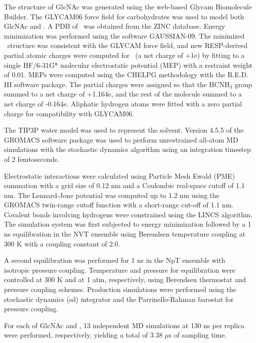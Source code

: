 The structure of GlcNAc was generated using the web-based Glycam Biomolecule Builder.\cite{Woods:glycambuilder} The GLYCAM06 force field for carbohydrates\cite{Kirschner:2008ii} was used to model both GlcNAc and \glucosamine. A PDB of \glucosamine\ was obtained from the ZINC database.\cite{Irwin:2005kx} Energy minimization was performed using the software GAUSSIAN-09.\cite{g09} The minimized \glucosamine\ structure was consistent with the GLYCAM force field, and new RESP-derived partial atomic charges were computed for \glucosamine\ (a net charge of +1e) by fitting to a single HF/6-31G* molecular electrostatic potential (MEP) with a restraint weight of 0.01. MEPs were computed using the CHELPG methodology\cite{Breneman:1990ue} with the R.E.D. III software package.\cite{Dupradeau:2010bb} The partial charges were assigned so that the HCNH$_{3}$ group summed to a net charge of +1.164e, and the rest of the molecule summed to a net charge of -0.164e. Aliphatic hydrogen atoms were fitted with a zero partial charge for compatibility with GLYCAM06.


The TIP3P water model was used to represent the solvent. Version 4.5.5 of the GROMACS software package\cite{Pronk:2013ef,Hess:2008p5353} was used to perform unrestrained all-atom MD simulations with the stochastic dynamics algorithm using an integration timestep of 2 femtoseconds.

Electrostatic interactions were calculated using Particle Mesh Ewald (PME) summation with a grid size of 0.12 nm and a Coulombic real-space cutoff of 1.1 nm. The Lennard-Jone potential was computed up to 1.2 nm using the GROMACS twin-range cutoff function with a short-range cut-off of 1.1 nm. Covalent bonds involving hydrogens were constrained using the LINCS algorithm. The simulation system was first subjected to energy minimization followed by a 1 ns equilibration in the NVT ensemble using Berendsen temperature coupling at 300 K with a coupling constant of 2.0.

A second equilibration was performed for 1 ns in the NpT ensemble with isotropic pressure coupling. Temperature and pressure for equilibration were controlled at 300 K and at 1 atm, respectively, using Berendsen thermostat and pressure coupling schemes. Production simulations were performed using the stochastic dynamics (sd) integrator and the Parrinello-Rahman barostat for pressure coupling.

For each of GlcNAc and \glucosamine, 13 independent MD simulations at 130 ns per replica were performed, respectively, yielding a total of 3.38 $\mu$s of sampling time.

